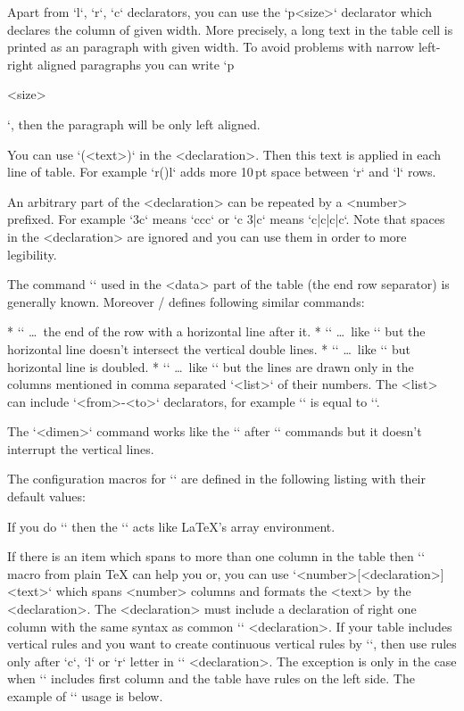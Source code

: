 {Apart from `l`, `r`, `c` declarators, you can use the `p{<size>}` declarator
which declares the column of given width. More precisely, a long text in
the table cell is printed as an paragraph with given width.
To avoid problems with narrow left-right aligned paragraphs you can write
`p{<size>\raggedright}`, then the paragraph will be only left aligned.

You can use `(<text>)` in the <declaration>. Then this text is applied in
each line of table. For example `r(\kern10pt)l` adds more 10\,pt space
between `r` and `l` rows. 

An arbitrary part of the <declaration> can be repeated by a <number>
prefixed. For example `3c` means `ccc` or `c 3{|c}` means
`c|c|c|c`. Note that spaces in the <declaration> are ignored and you 
can use them in order to more legibility.
 
The command `\cr` used in the <data> part of the table (the end row
separator) is generally known. 
Moreover \OpTeX/ defines following similar commands:

\begitems
* `\crl` \dots\ the end of the row with a horizontal line after it.
* `\crli` \dots\ like `\crl` but the horizontal line doesn't intersect the
      vertical double lines.
* `\crlli` \dots\ like `\crli` but horizontal line is doubled.
* `` \dots\ like `\crli` but the lines are drawn only in the
  columns mentioned in comma separated `<list>` of their numbers.
  The <list> can include `<from>-<to>` declarators, for example
  `` is equal to ``. 
\enditems

The `\tskip<dimen>` command works like the `` 
after `\cr*` commands but it doesn't interrupt the vertical lines.

The configuration macros for `\table` are defined in the following listing
with their default values:

\begtt
\def\tabiteml{\enspace} %
\def\tabitemr{\enspace} %
\def\tabstrut{\strut}   %
\def\vvkern{1pt}        %
\def\hhkern{1pt}        %
\endtt

If you do `\def\tabiteml{$\enspace}\def\tabitemr{\enspace$}` then
the `\table` acts like \LaTeX's array environment.

If there is an item which spans to more than one column in the table then
`` macro from plain \TeX{} can help you or, you can use
`\mspan<number>[<declaration>]{<text>}`
which spans <number> columns and formats the <text> by the
<declaration>. The <declaration> must include a declaration of right one column
with the same syntax as common `\table` <declaration>.
If your table includes vertical rules and you want to
create continuous vertical rules by `\mspan`, then use rules
only after `c`, `l` or `r` letter in `\mspan` <declaration>. The
exception is only in the case when `\mspan` includes first
column and the table have rules on the left side. The example of `\mspan` usage is below.

}
